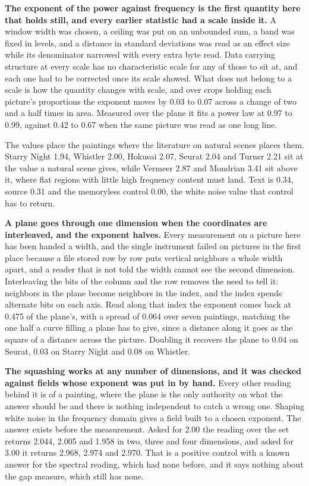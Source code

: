 \textbf{The exponent of the power against frequency is the first quantity here that holds still, and every earlier statistic had a scale inside it.} A window width was chosen, a ceiling was put on an unbounded sum, a band was fixed in levels, and a distance in standard deviations was read as an effect size while its denominator narrowed with every extra byte read. Data carrying structure at every scale has no characteristic scale for any of those to sit at, and each one had to be corrected once its scale showed. What does not belong to a scale is how the quantity changes with scale, and over crops holding each picture's proportions the exponent moves by 0.03 to 0.07 across a change of two and a half times in area. Measured over the plane it fits a power law at 0.97 to 0.99, against 0.42 to 0.67 when the same picture was read as one long line.

The values place the paintings where the literature on natural scenes places them. Starry Night 1.94, Whistler 2.00, Hokusai 2.07, Seurat 2.04 and Turner 2.21 sit at the value a natural scene gives, while Vermeer 2.87 and Mondrian 3.41 sit above it, where flat regions with little high frequency content must land. Text is 0.34, source 0.31 and the memoryless control 0.00, the white noise value that control has to return.

\textbf{A plane goes through one dimension when the coordinates are interleaved, and the exponent halves.} Every measurement on a picture here has been handed a width, and the single instrument failed on pictures in the first place because a file stored row by row puts vertical neighbors a whole width apart, and a reader that is not told the width cannot see the second dimension. Interleaving the bits of the column and the row removes the need to tell it: neighbors in the plane become neighbors in the index, and the index spends alternate bits on each axis. Read along that index the exponent comes back at 0.475 of the plane's, with a spread of 0.064 over seven paintings, matching the one half a curve filling a plane has to give, since a distance along it goes as the square of a distance across the picture. Doubling it recovers the plane to 0.04 on Seurat, 0.03 on Starry Night and 0.08 on Whistler.

\textbf{The squashing works at any number of dimensions, and it was checked against fields whose exponent was put in by hand.} Every other reading behind it is of a painting, where the plane is the only authority on what the answer should be and there is nothing independent to catch a wrong one. Shaping white noise in the frequency domain gives a field built to a chosen exponent. The answer exists before the measurement. Asked for 2.00 the reading over the set returns 2.044, 2.005 and 1.958 in two, three and four dimensions, and asked for 3.00 it returns 2.968, 2.974 and 2.970. That is a positive control with a known answer for the spectral reading, which had none before, and it says nothing about the gap measure, which still has none.

